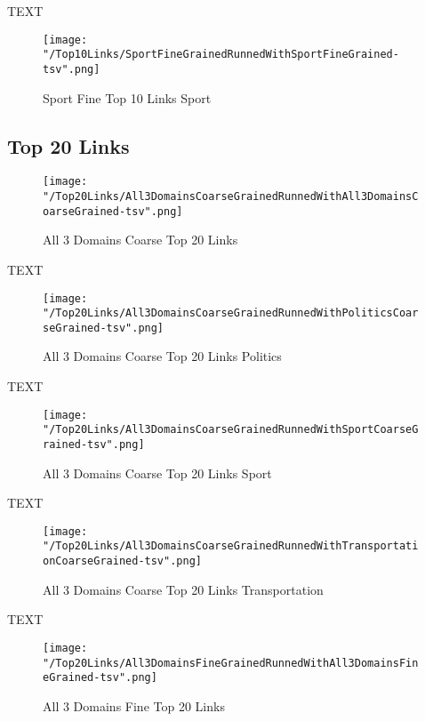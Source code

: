 \documentclass[thesis=M,english]{FITthesis}[2018/05/30]
\begin{document}
		TEXT	

	\begin{figure}\centering
		\texttt{[image: "/Top10Links/SportFineGrainedRunnedWithSportFineGrained-tsv".png]}
		\caption{Sport Fine Top 10 Links Sport}\label{}	
	\end{figure}

\subsection{Top 20 Links}

	\begin{figure}\centering
		\texttt{[image: "/Top20Links/All3DomainsCoarseGrainedRunnedWithAll3DomainsCoarseGrained-tsv".png]}
		\caption{All 3 Domains Coarse Top 20 Links}\label{}
	\end{figure}

	TEXT

	\begin{figure}\centering
		\texttt{[image: "/Top20Links/All3DomainsCoarseGrainedRunnedWithPoliticsCoarseGrained-tsv".png]}
		\caption{All 3 Domains Coarse Top 20 Links Politics}\label{}
	\end{figure}	

	TEXT	

	\begin{figure}\centering
		\texttt{[image: "/Top20Links/All3DomainsCoarseGrainedRunnedWithSportCoarseGrained-tsv".png]}
		\caption{All 3 Domains Coarse Top 20 Links Sport}\label{}
	\end{figure}
	
		TEXT	

	\begin{figure}\centering
		\texttt{[image: "/Top20Links/All3DomainsCoarseGrainedRunnedWithTransportationCoarseGrained-tsv".png]}
		\caption{All 3 Domains Coarse Top 20 Links Transportation}\label{}	
	\end{figure}
		
		TEXT	

	\begin{figure}\centering
		\texttt{[image: "/Top20Links/All3DomainsFineGrainedRunnedWithAll3DomainsFineGrained-tsv".png]}
		\caption{All 3 Domains Fine Top 20 Links }\label{}	
	\end{figure}
	
\end{document}
